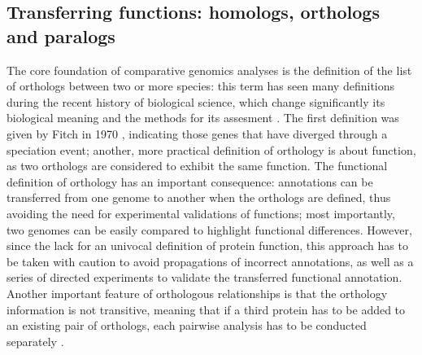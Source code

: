 \subsection{Transferring functions: homologs, orthologs and paralogs}
The core foundation of comparative genomics analyses is the definition of the list of orthologs between two or more species: this term has seen many definitions during the recent history of biological science, which change significantly its biological meaning and the methods for its assesment \cite{altenhoff2009phylogenetic}. The first definition was given by Fitch in 1970 \cite{fitch1970distinguishing}, indicating those genes that have diverged through a speciation event; another, more practical definition of orthology is about function, as two orthologs are considered to exhibit the same function. The functional definition of orthology has an important consequence: annotations can be transferred from one genome to another when the orthologs are defined, thus avoiding the need for experimental validations of functions; most importantly, two genomes can be easily compared to highlight functional differences. However, since the lack for an univocal definition of protein function, this approach has to be taken with caution to avoid propagations of incorrect annotations, as well as a series of directed experiments to validate the transferred functional annotation. Another important feature of orthologous relationships is that the orthology information is not transitive, meaning that if a third protein has to be added to an existing pair of orthologs, each pairwise analysis has to be conducted separately \cite{altenhoff2009phylogenetic}.

